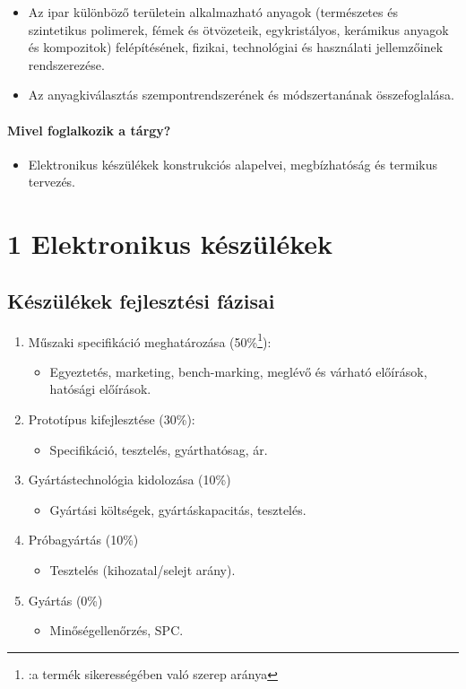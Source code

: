 \documentclass[11pt]{article}
\begin{document}
			\begin{itemize}
				\item Az ipar különböző területein alkalmazható anyagok (természetes és szintetikus polimerek, fémek és ötvözeteik, egykristályos, kerámikus anyagok és kompozitok) felépítésének, fizikai, technológiai és használati jellemzőinek rendszerezése.
				\item Az anyagkiválasztás szempontrendszerének és módszertanának összefoglalása.
			\end{itemize}

		\paragraph{Mivel foglalkozik a tárgy?} 

			\begin{itemize}
				\item Elektronikus készülékek konstrukciós alapelvei, megbízhatóság és termikus tervezés.
			\end{itemize}

	\section{1 Elektronikus készülékek}

		\subsection{Készülékek fejlesztési fázisai}

			\begin{enumerate}
				\item Műszaki specifikáció meghatározása (50\%\footnote[1]{:a termék sikerességében való szerep aránya}):
					\begin{itemize}
						\item Egyeztetés, marketing, bench-marking, meglévő és várható előírások, hatósági előírások.
					\end{itemize}
				\item Prototípus kifejlesztése (30\%\footnotemark[1]):
				\begin{itemize}
					\item Specifikáció, tesztelés, gyárthatósag, ár.
				\end{itemize} 
				\item Gyártástechnológia kidolozása (10\%\footnotemark[1])
				\begin{itemize}
					\item Gyártási költségek, gyártáskapacitás, tesztelés.
				\end{itemize}
				\item Próbagyártás (10\%\footnotemark[1])
				\begin{itemize}
					\item Tesztelés (kihozatal/selejt arány).
				\end{itemize} 
				\item Gyártás (0\%\footnotemark[1])
				\begin{itemize}
					\item Minőségellenőrzés, SPC.
				\end{itemize}
			\end{enumerate}
\end{document}
